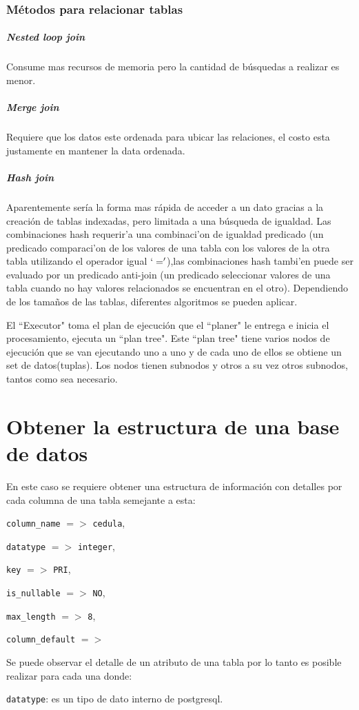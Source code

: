 \subsubsection{M\'etodos para relacionar tablas}
\subparagraph{Nested loop join}
Consume mas recursos de memoria pero la cantidad de b\'usquedas a realizar es menor.
\subparagraph{Merge join}
Requiere que los datos este ordenada para ubicar las relaciones, el costo esta justamente en mantener la data ordenada.
\subparagraph{Hash join}
Aparentemente ser\'ia la forma mas r\'apida de acceder a un dato gracias a la creaci\'on de tablas indexadas, pero limitada a una b\'usqueda de igualdad. Las combinaciones hash requerir'a una combinaci'on de igualdad predicado (un predicado comparaci'on de los valores de una tabla con los valores de la otra tabla utilizando el operador igual $`='$),las combinaciones hash tambi'en puede ser evaluado por un predicado anti-join (un predicado seleccionar valores de una tabla cuando no hay valores relacionados se encuentran en el otro). Dependiendo de los tama\~nos de las tablas, diferentes algoritmos se pueden aplicar.

El ``Executor" toma el plan de ejecuci\'on que el ``planer" le entrega e inicia el procesamiento, ejecuta un ``plan tree".
Este ``plan tree" tiene varios nodos de ejecuci\'on que se van ejecutando uno a uno y de cada uno de ellos se obtiene un set de datos(tuplas). Los nodos tienen subnodos y otros a su vez otros subnodos, tantos como sea necesario.
\section{Obtener la estructura de una base de datos}
En este caso se requiere obtener una estructura de informaci\'on con detalles por cada columna de una tabla semejante a esta:

\texttt{column\_name} $=>$ \texttt{cedula},
 
\texttt{datatype} $=>$ \texttt{integer}, 

\texttt{key} $=>$ \texttt{PRI},

\texttt{is\_nullable} $=>$ \texttt{NO},

\texttt{max\_length} $=>$ \texttt{8}, 

\texttt{column\_default} $=>$

Se puede observar el detalle de un atributo de una tabla por lo tanto es posible realizar para cada una donde:

\texttt{datatype}: es un tipo de dato interno de postgresql.


